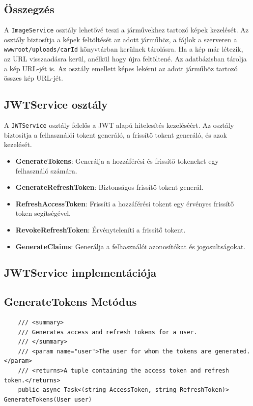 \documentclass{report}[11pt]
\begin{document}
\subsection*{Összegzés}
A \texttt{ImageService} osztály lehetővé teszi a járművekhez tartozó képek kezelését. Az osztály biztosítja a képek feltöltését az adott járműhöz, a fájlok a szerveren a \texttt{wwwroot/uploads/{carId}} könyvtárban kerülnek tárolásra. Ha a kép már létezik, az URL visszaadásra kerül, anélkül hogy újra feltöltené. Az adatbázisban tárolja a kép URL-jét is. Az osztály emellett képes lekérni az adott járműhöz tartozó összes kép URL-jét.

\subsection{JWTService osztály}

A \texttt{JWTService} osztály felelős a JWT alapú hitelesítés kezeléséért. Az osztály biztosítja a felhasználói tokent generáló, a frissítő tokent generáló, és azok kezelését.

\begin{itemize}
    \item \textbf{GenerateTokens}: Generálja a hozzáférési és frissítő tokeneket egy felhasználó számára.
    \item \textbf{GenerateRefreshToken}: Biztonságos frissítő tokent generál.
    \item \textbf{RefreshAccessToken}: Frissíti a hozzáférési tokent egy érvényes frissítő token segítségével.
    \item \textbf{RevokeRefreshToken}: Érvényteleníti a frissítő tokent.
    \item \textbf{GenerateClaims}: Generálja a felhasználói azonosítókat és jogosultságokat.
\end{itemize}

\subsection{JWTService implementációja}

\subsection*{GenerateTokens Metódus}
\begin{lstlisting}
    /// <summary>
    /// Generates access and refresh tokens for a user.
    /// </summary>
    /// <param name="user">The user for whom the tokens are generated.</param>
    /// <returns>A tuple containing the access token and refresh token.</returns>
    public async Task<(string AccessToken, string RefreshToken)> GenerateTokens(User user)
\end{lstlisting}
\end{document}
